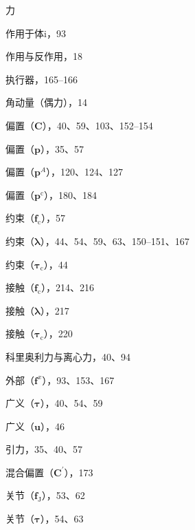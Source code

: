 \documentclass[10pt,a4paper]{book}
\theoremstyle{thmstyle} %
\theoremstyle{defstyle} %
\theoremstyle{prostyle} %
\begin{document}
力



作用于体i，93



作用与反作用，18



执行器，165–166



角动量（偶力），14



偏置（$\boldsymbol{C}$），40、59、103、152–154



偏置（$\boldsymbol{p}$），35、57



偏置（$\boldsymbol{p}^{A}$），120、124、127



偏置（$\boldsymbol{p}^{\mathrm{c}}$），180、184



约束（$\boldsymbol{f}_{\mathrm{c}}$），57



约束（$\boldsymbol{\lambda}$），44、54、59、63、150–151、167



约束（$\boldsymbol{\tau}_{\mathrm{c}}$），44



接触（$\boldsymbol{f}_{\mathrm{c}}$），214、216



接触（$\boldsymbol{\lambda}$），217



接触（$\boldsymbol{\tau}_{\mathrm{c}}$），220



科里奥利力与离心力，40、94



外部（$\boldsymbol{f}^{x}$），93、153、167



广义（$\boldsymbol{\tau}$），40、54、59



广义（$\boldsymbol{u}$），46



引力，35、40、57



混合偏置（$\boldsymbol{C}^{\prime}$），173



关节（$\boldsymbol{f}_{\mathrm{J}}$），53、62



关节（$\boldsymbol{\tau}$），54、63
\end{document}
